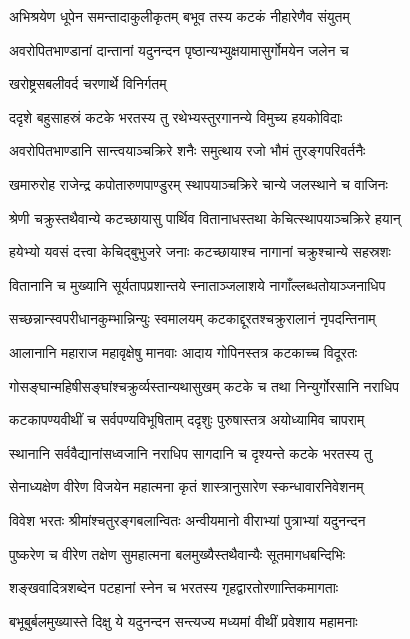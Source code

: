 \twolineshloka
{अभिश्रयेण धूपेन समन्तादाकुलीकृतम्}
{बभूव तस्य कटकं नीहारेणैव संयुतम्}%

\twolineshloka
{अवरोपितभाण्डानां दान्तानां यदुनन्दन}
{पृष्ठान्यभ्युक्षयामासुर्गोमयेन जलेन च}%

\onelineshloka
{खरोष्ट्रसबलीवर्द चरणार्थे विनिर्गतम्}%

\twolineshloka
{ददृशे बहुसाहस्रं कटके भरतस्य तु}
{रथेभ्यस्तुरगानन्ये विमुच्य हयकोविदाः}%

\twolineshloka
{अवरोपितभाण्डानि सान्त्वयाञ्चक्रिरे शनैः}
{समुत्थाय रजो भौमं तुरङ्गपरिवर्तनैः}%

\twolineshloka
{खमारुरोह राजेन्द्र कपोतारुणपाण्डुरम्}
{स्थापयाञ्चक्रिरे चान्ये जलस्थाने च वाजिनः}%

\twolineshloka
{श्रेणी चक्रुस्तथैवान्ये कटच्छायासु पार्थिव}
{वितानाधस्तथा केचित्स्थापयाञ्चक्रिरे हयान्}%

\twolineshloka
{हयेभ्यो यवसं दत्त्वा केचिद्बुभुजरे जनाः}
{कटच्छायाश्च नागानां चक्रुश्चान्ये सहस्रशः} %

\twolineshloka
{वितानानि च मुख्यानि सूर्यतापप्रशान्तये}
{स्नाताञ्जलाशये नागाँल्लब्धतोयाञ्जनाधिप}%

\twolineshloka
{सच्छन्नान्स्वपरीधानकुम्भान्निन्युः स्वमालयम्}
{कटकाद्दूरतश्चक्रुरालानं नृपदन्तिनाम्}%

\twolineshloka
{आलानानि महाराज महावृक्षेषु मानवाः}
{आदाय गोपिनस्तत्र कटकाच्च विदूरतः}%

\twolineshloka
{गोसङ्घान्महिषीसङ्घांश्चक्रुर्व्यस्तान्यथासुखम्}
{कटके च तथा निन्युर्गोरसानि नराधिप}%

\twolineshloka
{कटकापण्यवीथीं च सर्वपण्यविभूषिताम्}
{ददृशुः पुरुषास्तत्र अयोध्यामिव चापराम्}%

\twolineshloka
{स्थानानि सर्ववैद्यानांसध्वजानि नराधिप}
{सागदानि च दृश्यन्ते कटके भरतस्य तु}%

\twolineshloka
{सेनाध्यक्षेण वीरेण विजयेन महात्मना}
{कृतं शास्त्रानुसारेण स्कन्धावारनिवेशनम्}%

\twolineshloka
{विवेश भरतः श्रीमांश्चतुरङ्गबलान्वितः}
{अन्वीयमानो वीराभ्यां पुत्राभ्यां यदुनन्दन}%

\twolineshloka
{पुष्करेण च वीरेण तक्षेण सुमहात्मना}
{बलमुख्यैस्तथैवान्यैः सूतमागधबन्दिभिः}%

\twolineshloka
{शङ्खवादित्रशब्देन पटहानां स्नेन च}
{भरतस्य गृहद्वारतोरणान्तिकमागताः} %

\twolineshloka
{बभूबुर्बलमुख्यास्ते दिक्षु ये यदुनन्दन}
{सन्त्यज्य मध्यमां वीथीं प्रवेशाय महामनाः}%

